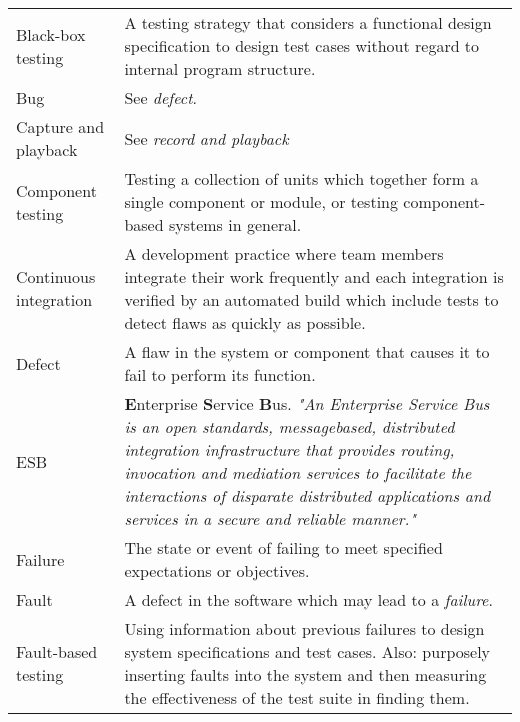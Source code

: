\documentclass[12pt,a4paper,oneside,pdftex]{report}
\begin{document}
\begin{longtable}{@{}p{}p{}@{}}

Black-box testing & A testing strategy that considers a functional design specification to design test cases without regard to internal program structure. \citep{burnstein2003practical} \\[0.3cm]

Bug & See \emph{defect}. \\[0.3cm]

Capture and playback & See \emph{record and playback} \\[0.8cm]

Component testing & Testing a collection of units which together form a single component or module, or testing component-based systems in general. \citep{wu2003uml, ieee2010systems} \\[0.3cm]

Continuous integration & A development practice where team members integrate their work frequently and each integration is verified by an automated build which include tests to detect flaws as quickly as possible. \citep{fowler2006continuous} \\[0.3cm]

Defect & A flaw in the system or component that causes it to fail to perform its function. \citep{burnstein2003practical, ieee2010systems} \\[0.3cm]

ESB & \textbf{E}nterprise \textbf{S}ervice \textbf{B}us. \emph{"An Enterprise Service Bus is an open standards, messagebased, distributed integration infrastructure that provides routing, invocation and mediation services to facilitate the interactions of disparate distributed applications and services in a secure and reliable manner."} \citep{menge2007enterprise} \\[0.3cm]

Failure & The state or event of failing to meet specified expectations or objectives. \citep{ieee2010systems} \\[0.3cm]

Fault & A defect in the software which may lead to a \emph{failure}. \citep{ieee2010systems} \\[0.3cm] 

Fault-based testing & Using information about previous failures to design system specifications and test cases. Also: purposely inserting faults into the system and then measuring the effectiveness of the test suite in finding them. \citep{pezze2008software} \\[0.3cm] 


\end{longtable}
\end{document}
